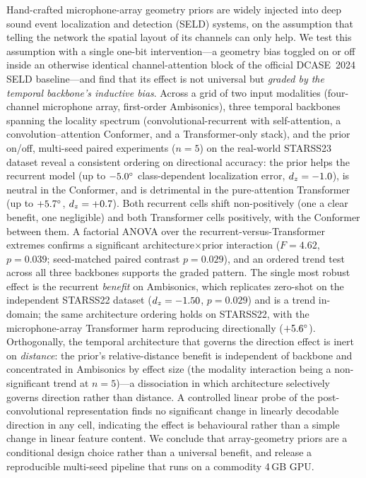 Hand-crafted microphone-array geometry priors are widely injected into deep
sound event localization and detection (SELD) systems, on the assumption that
telling the network the spatial layout of its channels can only help. We test
this assumption with a single one-bit intervention---a geometry bias toggled on
or off inside an otherwise identical channel-attention block of the official
DCASE~2024 SELD baseline---and find that its effect is not universal but
\emph{graded by the temporal backbone's inductive bias}. Across a grid of two
input modalities (four-channel microphone array, first-order Ambisonics), three
temporal backbones spanning the locality spectrum (convolutional-recurrent with
self-attention, a convolution--attention Conformer, and a Transformer-only
stack), and the prior on/off, multi-seed paired experiments ($n=5$) on the
real-world STARSS23 dataset reveal a consistent ordering on directional
accuracy: the prior helps the recurrent model (up to $-5.0^\circ$
class-dependent localization error, $d_z=-1.0$), is neutral in the Conformer,
and is detrimental in the pure-attention Transformer (up to $+5.7^\circ$,
$d_z=+0.7$). Both recurrent cells shift non-positively (one a clear benefit, one
negligible) and both Transformer cells positively, with the Conformer between them. A factorial ANOVA over the
recurrent-versus-Transformer extremes confirms a significant
architecture$\times$prior interaction ($F=4.62$, $p=0.039$; seed-matched paired
contrast $p=0.029$), and an ordered trend test across all three backbones
supports the graded pattern. The single most
robust effect is the recurrent \emph{benefit} on Ambisonics, which replicates
zero-shot on the independent STARSS22 dataset ($d_z=-1.50$, $p=0.029$) and is a
trend in-domain; the same architecture ordering holds on STARSS22, with the
microphone-array Transformer harm reproducing directionally ($+5.6^\circ$).
Orthogonally, the temporal architecture that governs the direction effect is
inert on \emph{distance}: the prior's relative-distance benefit is independent of
backbone and concentrated in Ambisonics by effect size (the modality interaction
being a non-significant trend at $n=5$)---a dissociation in which architecture
selectively governs direction rather than distance. A controlled linear probe of
the post-convolutional representation finds no significant change in linearly
decodable direction in any cell, indicating the effect is behavioural rather than
a simple change in linear feature content. We conclude that array-geometry priors
are a conditional design choice rather than a universal benefit, and release a
reproducible multi-seed pipeline that runs on a commodity 4\,GB GPU.
